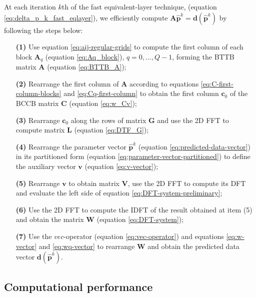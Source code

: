 At each iteration $k$th of the fast equivalent-layer technique, 
(equation \ref{eq:delta_p_k_fast_eqlayer}), we efficiently compute 
$\mathbf{A} \hat{\mathbf{p}}^{k} = \mathbf{d}(\hat{\mathbf{p}}^{k})$ by following 
the steps below:

\begin{itemize}
\item[\textbf{(1)}] Use equation \ref{eq:aij-regular-grids} to compute the first column 
of each block $\mathbf{A}_{q}$ (equation \ref{eq:Aq_block}), $q = 0, \dots, Q-1$, forming 
the BTTB matrix $\mathbf{A}$ (equation \ref{eq:BTTB_A});

\item[\textbf{(2)}] Rearrange the first column of $\mathbf{A}$ according to equations 
\ref{eq:C-first-column-blocks} and \ref{eq:Cq-first-column} to obtain the
first column $\mathbf{c}_{0}$ of the BCCB matrix $\mathbf{C}$ (equation \ref{eq:w_Cv});

\item[\textbf{(3)}] Rearrange $\mathbf{c}_{0}$ along the rows of matrix $\mathbf{G}$ and
use the 2D FFT to compute matrix $\mathbf{L}$ (equation \ref{eq:DTF_G});

\item[\textbf{(4)}] Rearrange the parameter vector $\hat{\mathbf{p}}^{k}$ 
(equation \ref{eq:predicted-data-vector}) in its partitioned form 
(equation \ref{eq:parameter-vector-partitioned}) to define the auxiliary vector 
$\mathbf{v}$ (equation \ref{eq:v-vector});

\item[\textbf{(5)}] Rearrange $\mathbf{v}$ to obtain matrix $\mathbf{V}$, use the 2D FFT 
to compute its DFT and evaluate the left side of equation \ref{eq:DFT-system-preliminary};

\item[\textbf{(6)}] Use the 2D FFT to compute the IDFT of the result obtained at item (5) and 
obtain the matrix $\mathbf{W}$ (equation \ref{eq:DFT-system});

\item[\textbf{(7)}] Use the $vec$-operator (equation \ref{eq:vec-operator}) and equations 
\ref{eq:w-vector} and \ref{eq:wq-vector} to rearrange $\mathbf{W}$ and obtain the predicted 
data vector $\mathbf{d}(\hat{\mathbf{p}}^{k})$.

\end{itemize}


\subsection{Computational performance}


